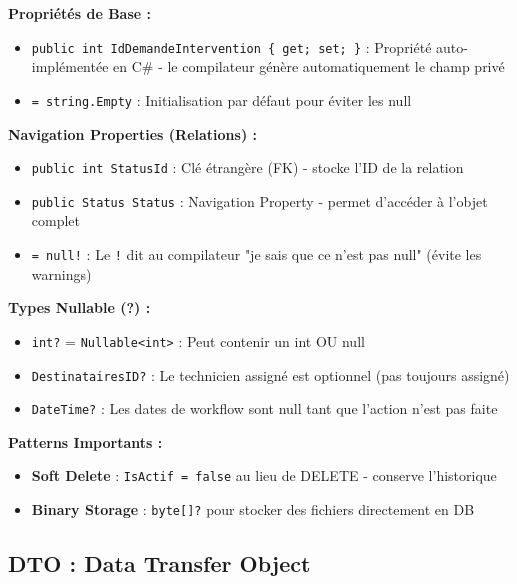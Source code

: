 \documentclass[12pt,a4paper]{article}
\begin{document}
\begin{infobox}[title={\faLightbulb\ Explication Détaillée du Code}]
\textbf{Propriétés de Base :}
\begin{itemize}
    \item \texttt{public int IdDemandeIntervention \{ get; set; \}} : Propriété auto-implémentée en C\# - le compilateur génère automatiquement le champ privé
    \item \texttt{= string.Empty} : Initialisation par défaut pour éviter les null
\end{itemize}

\textbf{Navigation Properties (Relations) :}
\begin{itemize}
    \item \texttt{public int StatusId} : Clé étrangère (FK) - stocke l'ID de la relation
    \item \texttt{public Status Status} : Navigation Property - permet d'accéder à l'objet complet
    \item \texttt{= null!} : Le \texttt{!} dit au compilateur "je sais que ce n'est pas null" (évite les warnings)
\end{itemize}

\textbf{Types Nullable (?) :}
\begin{itemize}
    \item \texttt{int?} = \texttt{Nullable<int>} : Peut contenir un int OU null
    \item \texttt{DestinatairesID?} : Le technicien assigné est optionnel (pas toujours assigné)
    \item \texttt{DateTime?} : Les dates de workflow sont null tant que l'action n'est pas faite
\end{itemize}

\textbf{Patterns Importants :}
\begin{itemize}
    \item \textbf{Soft Delete} : \texttt{IsActif = false} au lieu de DELETE - conserve l'historique
    \item \textbf{Binary Storage} : \texttt{byte[]?} pour stocker des fichiers directement en DB
\end{itemize}
\end{infobox}

\newpage

\subsection{DTO : Data Transfer Object}
\end{document}
